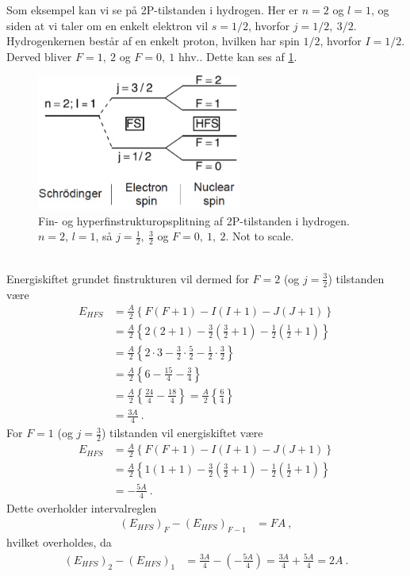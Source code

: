 Som eksempel kan vi se på 2P-tilstanden i hydrogen. Her er $n = 2$ og $l = 1$, og siden at vi taler om en enkelt elektron vil $s = 1/2$, hvorfor $j = 1/2,\: 3/2$. Hydrogenkernen består af en enkelt proton, hvilken har spin $1/2$, hvorfor $I = 1/2$. Derved bliver $F = 1,\: 2$ og $F = 0,\: 1$ hhv.. Dette kan ses af \cref{fig:Q16_HyperFineSplittingOf2PstateInHydrogen}.
\begin{figure}[!h]
    \centering
    \includegraphics[width=0.60\textwidth]{Q16/images/HyperFineSplittingOf2PstateInHydrogen.PNG}
    \caption{Fin- og hyperfinstrukturopsplitning af 2P-tilstanden i hydrogen. $n = 2$, $l = 1$, så $j = \frac{1}{2}, \: \frac{3}{2}$ og $F = 0,\: 1,\: 2$. Not to scale.}
    \label{fig:Q16_HyperFineSplittingOf2PstateInHydrogen}
\end{figure}\\
Energiskiftet grundet finstrukturen vil dermed for $F = 2$ (og $j = \frac{3}{2}$) tilstanden være
\begin{align}
    E_{HFS} &= \frac{A}{2} \left\{F(F+1) - I(I+1) - J(J+1)\right\} \nonumber\\
    &= \frac{A}{2} \left\{2(2+1) - \frac{3}{2}(\frac{3}{2}+1) - \frac{1}{2}(\frac{1}{2}+1)\right\} \nonumber\\
    &= \frac{A}{2} \left\{2 \cdot 3 - \frac{3}{2} \cdot \frac{5}{2} - \frac{1}{2} \cdot \frac{3}{2}\right\} \nonumber\\
    &= \frac{A}{2} \left\{6 - \frac{15}{4} - \frac{3}{4}\right\} \nonumber\\
    &= \frac{A}{2} \left\{\frac{24}{4} - \frac{18}{4}\right\}
    = \frac{A}{2} \left\{\frac{6}{4}\right\} \nonumber\\
    &= \frac{3A}{4} \: .
\end{align}
For $F = 1$ (og $j = \frac{3}{2}$) tilstanden vil energiskiftet være
\begin{align}
    E_{HFS} &= \frac{A}{2} \left\{F(F+1) - I(I+1) - J(J+1)\right\} \nonumber\\
    &= \frac{A}{2} \left\{1(1+1) - \frac{3}{2}(\frac{3}{2}+1) - \frac{1}{2}(\frac{1}{2}+1)\right\} \nonumber\\
    &= -\frac{5A}{4} \: .
\end{align}
Dette overholder \textsf{intervalreglen}
\begin{align}
    (E_{HFS})_F - (E_{HFS})_{F-1} &= FA \: ,
\end{align}
hvilket overholdes, da
\begin{align}
    (E_{HFS})_2 - (E_{HFS})_1 &= \frac{3A}{4} - \left(-\frac{5A}{4}\right) = \frac{3A}{4} + \frac{5A}{4} = 2A \: .
\end{align}